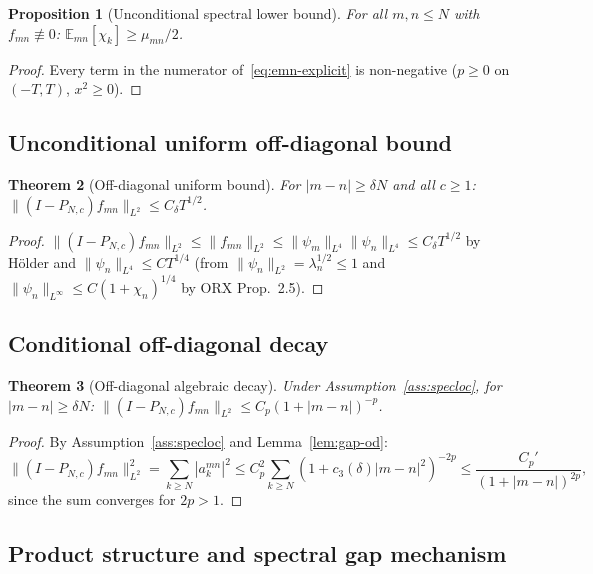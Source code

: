 \documentclass[12pt,a4paper]{amsart}
\newtheorem{theorem}{Theorem}[section]
\newtheorem{proposition}[theorem]{Proposition}
\theoremstyle{definition}
\newcommand{\PN}{P_{N,c}}
\newcommand{\mumN}{\mu_{mn}}
\newcommand{\Emn}{\mathbb{E}_{mn}}
\begin{document}
\begin{proposition}[Unconditional spectral lower bound]\label{prop:spectral-lower}
For all $m,n \le N$ with $f_{mn}\not\equiv 0$:
$\Emn[\chi_k] \ge \mumN/2$.
\end{proposition}

\begin{proof}
Every term in the numerator of~\eqref{eq:emn-explicit} is non-negative
($p \ge 0$ on $(-T,T)$, $x^2 \ge 0$).
\end{proof}

\subsection{Unconditional uniform off-diagonal bound}

\begin{theorem}[Off-diagonal uniform bound]\label{thm:offdiag}
For $|m-n| \ge \delta N$ and all $c \ge 1$:
$\|(I-\PN)f_{mn}\|_{L^2} \le C_\delta T^{1/2}$.
\end{theorem}

\begin{proof}
$\|(I-\PN)f_{mn}\|_{L^2} \le \|f_{mn}\|_{L^2}
\le \|\psi_m\|_{L^4}\|\psi_n\|_{L^4}
\le C_\delta T^{1/2}$
by H\"{o}lder and $\|\psi_n\|_{L^4} \le C T^{1/4}$
(from $\|\psi_n\|_{L^2} = \lambda_n^{1/2} \le 1$
and $\|\psi_n\|_{L^\infty} \le C(1+\chi_n)^{1/4}$
by ORX Prop.~2.5).
\end{proof}

\subsection{Conditional off-diagonal decay}

\begin{theorem}[Off-diagonal algebraic decay]\label{thm:offdiag-strong}
Under Assumption~\ref{ass:specloc}, for $|m-n| \ge \delta N$:
$\|(I-\PN)f_{mn}\|_{L^2} \le C_p(1+|m-n|)^{-p}$.
\end{theorem}

\begin{proof}
By Assumption~\ref{ass:specloc} and Lemma~\ref{lem:gap-od}:
\[
  \|(I-\PN)f_{mn}\|_{L^2}^2
  = \sum_{k\ge N}|a_k^{mn}|^2
  \le C_p^2\sum_{k\ge N}(1+c_3(\delta)|m-n|^2)^{-2p}
  \le \frac{C_p'}{(1+|m-n|)^{2p}},
\]
since the sum converges for $2p > 1$.
\end{proof}

\subsection{Product structure and spectral gap mechanism}
\end{document}
